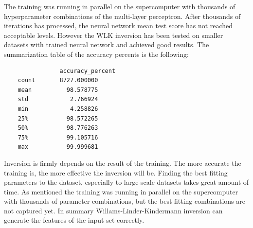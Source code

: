 The training was running in parallel on the supercomputer with thousands of hyperparameter combinations of the multi-layer perceptron. After thousands of iterations has processed, the neural network mean test score has not reached acceptable levels. However the WLK inversion has been tested on smaller datasets with trained neural network and achieved good results. The summarization table of the accuracy percents is the following: 
\begin{lstlisting}
        		accuracy_percent
	count       8727.000000
	mean          98.578775
	std            2.766924
	min            4.258826
	25%           98.572265
	50%           98.776263
	75%           99.105716
	max           99.999681
\end{lstlisting}

Inversion is firmly depends on the result of the training. The more accurate the training is, the more effective the inversion will be. Finding the best fitting parameters to the dataset, especially to large-scale datasets takes great amount of time. As mentioned the training was running in parallel on the supercomputer with thousands of parameter combinations, but the best fitting combinations are not captured yet. In summary Willams-Linder-Kindermann inversion can generate the features of the input set correctly. 

